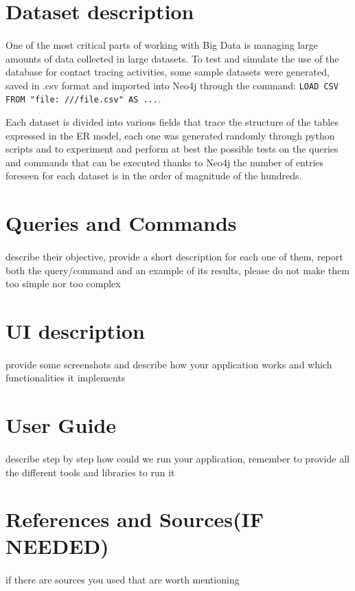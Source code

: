 \documentclass[a4paper,12pt]{article}
\begin{document}
\section{Dataset description}
\paragraph{} One of the most critical parts of working with Big Data is managing large amounts of data collected in large datasets. To test and simulate the use of the database for contact tracing activities, some sample datasets were generated, saved in .csv format and imported into Neo4j through the command: \texttt{LOAD CSV FROM "file: ///file.csv" AS ...}. \par
Each dataset is divided into various fields that trace the structure of the tables expressed in the ER model, each one was generated randomly through python scripts and to experiment and perform at best the possible tests on the queries and commands that can be executed thanks to Neo4j the number of entries foreseen for each dataset is in the order of magnitude of the hundreds.
\section{Queries and Commands}
\paragraph{}describe their objective, provide a short description for each one of them, report both the query/command and an example of its results, please do not make them too simple nor too complex
\section{UI description}
\paragraph{}provide some screenshots and describe how your application works and which functionalities it implements
\section{User Guide} 
\paragraph{} describe step by step how could we run your application, remember to provide all the different tools and libraries to run it
\section{References and Sources(IF NEEDED)}
\paragraph{}if there are sources you used that are worth mentioning
\end{document}
